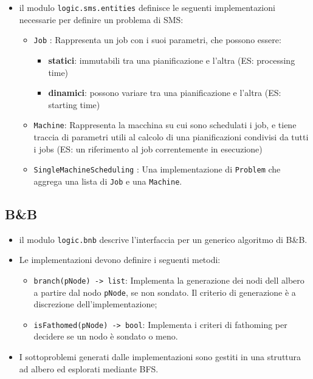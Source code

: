 \documentclass[compress]{beamer}
\begin{document}
    \begin{frame}{\subsecname}
        \begin{itemize}
            \item il modulo \texttt{logic.sms.entities} definisce le seguenti implementazioni
            necessarie per definire un problema di SMS:
            \begin{itemize}
                \item \texttt{Job} : Rappresenta un job con i suoi parametri, che possono essere:
                \begin{itemize}
                    \item \textbf{statici}: immutabili tra una pianificazione e l'altra (ES: processing time)
                    \item \textbf{dinamici}: possono variare tra una pianificazione e l'altra (ES: starting time)
                \end{itemize}
                \item \texttt{Machine}: Rappresenta la macchina su cui sono schedulati i job, e
                tiene traccia di parametri utili al calcolo di una pianificazioni condivisi da
                tutti i jobs (ES: un riferimento al job correntemente in esecuzione)
                \item \texttt{SingleMachineScheduling} : Una implementazione di \texttt{Problem} che
                aggrega una lista di \texttt{Job} e una \texttt{Machine}.
            \end{itemize}
        \end{itemize}
    \end{frame}

    
    \subsection{B\&B}

    \begin{frame}[fragile]{\subsecname}
        \begin{itemize}
            \item il modulo \texttt{logic.bnb} descrive l'interfaccia per un generico algoritmo
            di B\&B.
            \item Le implementazioni devono definire i seguenti metodi:
            \begin{itemize}
                \item \texttt{branch(pNode) -> list}: Implementa la generazione dei
                nodi dell albero a partire dal nodo \texttt{pNode}, se non sondato.
                Il criterio di generazione è a discrezione dell'implementazione;
                \item \texttt{isFathomed(pNode) -> bool}: Implementa i criteri di fathoming
                per decidere se un nodo è sondato o meno.
            \end{itemize}
            \item I sottoproblemi generati dalle implementazioni sono gestiti in una 
            struttura ad albero ed esplorati mediante BFS.
        \end{itemize}
    \end{frame}
\end{document}
